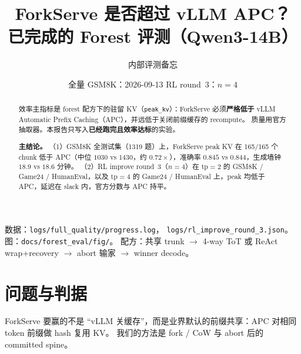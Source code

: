 \documentclass[11pt,a4paper]{article}
\title{\vspace{-2.2em}\textbf{ForkServe 是否超过 vLLM APC？}\\[0.35em]
\large 已完成的 Forest 评测（Qwen3-14B）}
\author{内部评测备忘}
\date{全量 GSM8K：2026-09-13 \quad RL round~3：$n=4$}
\begin{document}
\maketitle
\vspace{-1.4em}

\begin{abstract}
\noindent
效率主指标是 forest 配方下的驻留 KV（\texttt{peak\_kv}）：ForkServe 必须\textbf{严格低于} vLLM Automatic Prefix Caching（APC），并远低于关闭前缀缓存的 recompute。
质量用官方抽取器。本报告只写入\textbf{已经跑完且效率达标}的实验。

\textbf{主结论。}
（1）GSM8K 全测试集（1319 题）上，ForkServe peak KV 在 165/165 个 chunk 低于 APC（中位 $1030$ vs $1430$，约 $0.72\times$），准确率 $0.845$ vs $0.844$，生成墙钟 $18.9$ vs $18.6$ 分钟。
（2）RL improve round~3（$n=4$）在 tp$=2$ 的 GSM8K / Game24 / HumanEval，以及 tp$=4$ 的 Game24 / HumanEval 上，peak 均低于 APC，延迟在 slack 内，官方分数与 APC 持平。
\end{abstract}

\vspace{0.4em}
\noindent
{\color{Mute}\small
数据：\texttt{logs/full\_quality/progress.log}，
\texttt{logs/rl\_improve\_round\_3.json}。
图：\texttt{docs/forest\_eval/fig/}。
配方：共享 trunk $\to$ 4-way ToT 或 ReAct wrap+recovery $\to$ abort 输家 $\to$ winner decode。}

\section{问题与判据}

ForkServe 要赢的不是 ``vLLM 关缓存''，而是业界默认的前缀共享：APC 对相同 token 前缀做 hash 复用 KV。
我们的方法是 fork / CoW 与 abort 后的 committed spine。

\begin{center}
\end{center}
\end{document}
